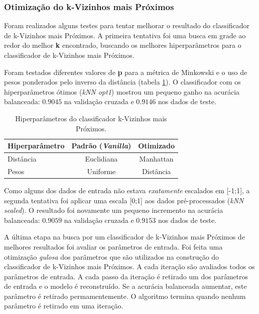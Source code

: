 \documentclass[final,5p]{elsarticle}
\numberwithin{equation}{section}
\begin{document}
        \subsubsection{Otimização do k-Vizinhos mais Próximos}

        Foram realizados alguns testes para tentar melhorar o resultado do classificador de k-Vizinhos mais Próximos. A primeira tentativa foi uma busca em grade ao redor do melhor \textbf{k} encontrado, buscando os melhores hiperparâmetros para o classificador de k-Vizinhos mais Próximos.

        Foram testados diferentes valores de \textbf{p} para a métrica de Minkowski e o uso de pesos ponderados pelo inverso da distância (tabela \ref{tab:parâmetros_knn}). O classificador com os hiperparâmetros ótimos (\emph{kNN opt1}) mostrou um pequeno ganho na acurácia balanceada: $0.9045$ na validação cruzada e $0.9146$ nos dados de teste.

        \begin{table}[h]
            \centering
            \begin{tabular}{l c c}
                \toprule
                \textbf{Hiperparâmetro} & \textbf{Padrão (\emph{Vanilla})}  & \textbf{Otimizado} \\
                \midrule
                Distância    & Euclidiana & Manhattan \\
                Pesos    & Uniforme & Distância \\
                \bottomrule
            \end{tabular}
            \caption{Hiperparâmetros do classificador k-Vizinhos mais Próximos.}
            \label{tab:parâmetros_knn}
        \end{table}

        Como alguns dos dados de entrada não estava \emph{exatamente} escalados em [-1;1], a segunda tentativa foi aplicar uma escala [0;1] aos dados pré-processados (\emph{kNN scaled}). O resultado foi novamente um pequeno incremento na acurácia balanceada: $0.9059$ na validação cruzada e $0.9153$ nos dados de teste.

        A última etapa na busca por um classificador de k-Vizinhos mais Próximos de melhores resultados foi avaliar os parâmetros de entrada. Foi feita uma otimização \emph{gulosa} dos parâmetros que são utilizados na construção do classificador de k-Vizinhos mais Próximos. A cada iteração são avaliados todos os parâmetros de entrada. A cada passo da iteração é retirado um dos parâmetros de entrada e o modelo é reconstruído. Se a acurácia balanceada aumentar, este parâmetro é retirado permamentemente. O algoritmo termina quando nenhum parâmetro é retirado em uma iteração.
\end{document}
